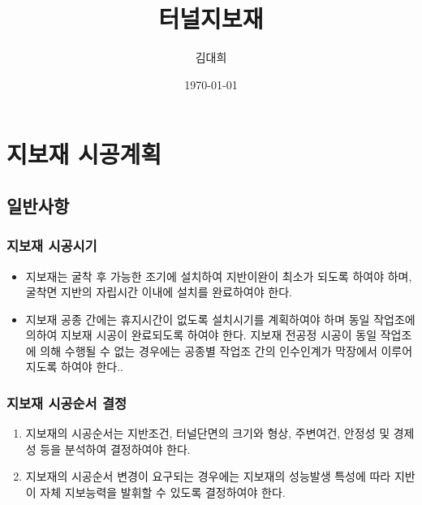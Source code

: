 \documentclass[12pt,a4paper]{article}
\begin{document}
\title{터널지보재}
\author{김대희}
\date{\today}
\maketitle

\doublespace

\newpage
\tableofcontents
\newpage
\listoffigures
\listoftables

\noindent
\medskip



\newpage
\section[지보재 시공계획]{지보재 시공계획}

%
%
%


\subsection{일반사항}

\subsubsection{지보재 시공시기}
\begin{itemize}
\item 지보재는 굴착 후 가능한 조기에 설치하여 지반이완이 최소가 되도록 하여야 하며, 굴착면 지반의 자립시간 이내에 설치를 완료하여야 한다.
\item 지보재 공종 간에는 휴지시간이 없도록 설치시기를 계획하여야 하며 동일 작업조에 의하여 지보재 시공이 완료되도록 하여야 한다. 지보재 전공정 시공이 동일 작업조에 의해 수행될 수 없는 경우에는 공종별 작업조 간의 인수인계가 막장에서 이루어지도록 하여야 한다..
\end{itemize}


\subsubsection{지보재 시공순서 결정}
\begin{enumerate}
\item 지보재의 시공순서는 지반조건, 터널단면의 크기와 형상, 주변여건, 안정성 및 경제성 등을 분석하여 결정하여야 한다.
\item 지보재의 시공순서 변경이 요구되는 경우에는 지보재의 성능발생 특성에 따라 지반이 자체 지보능력을 발휘할 수 있도록 결정하여야 한다.  
\end{enumerate}
\end{document}
